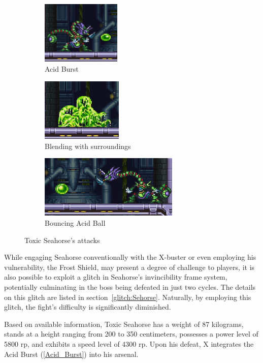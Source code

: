 \begin{figure}[htp]
	\centering
	\begin{subfigure}{.4\linewidth}
		\centering
		\includegraphics[height=3cm]{figures/X3/Toxic_seahorse/Seahorse_acid.jpg}
		\caption{Acid Burst}
	\end{subfigure}
	\begin{subfigure}{.4\linewidth}
		\centering
		\includegraphics[height=3cm]{figures/X3/Toxic_seahorse/Seahorse_blend.jpg}
		\caption{Blending with surroundings}
	\end{subfigure}
	\begin{subfigure}{\linewidth}
		\centering
		\includegraphics[height=3cm]{figures/X3/Toxic_seahorse/Seahorse_double.jpg}
		\caption{Bouncing Acid Ball}
	\end{subfigure}
	\caption{Toxic Seahorse's attacks}
	
\end{figure}

While engaging Seahorse conventionally with the X-buster or even employing his vulnerability, the Frost Shield, may present a degree of challenge to players, it is also possible to exploit a glitch in Seahorse's invincibility frame system, potentially culminating in the boss being defeated in just two cycles. The details on this glitch are listed in section~\ref{glitch:Sehorse}.
Naturally, by employing this glitch, the fight's difficulty is significantly diminished.

Based on available information, Toxic Seahorse has a weight of 87 kilograms, stands at a height ranging from 200 to 350 centimeters, possesses a power level of 5800 rp, and exhibits a speed level of 4300 rp. Upon his defeat, X integrates the Acid Burst (\ref{Acid_Burst}) into his arsenal.


